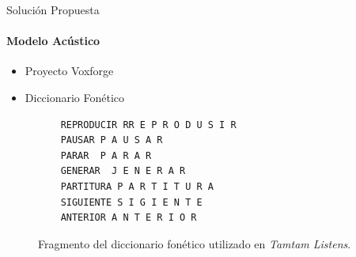 \begin{frame}[fragile]{Soluci\'on Propuesta}
\framesubtitle{Modelo Acústico}
\begin{itemize}
    \item Proyecto Voxforge
    \item Diccionario Fonético    
\end{itemize}

    \begin{figure}[H]
    \begin{lstlisting}
    REPRODUCIR RR E P R O D U S I R
    PAUSAR P A U S A R
    PARAR  P A R A R
    GENERAR  J E N E R A R
    PARTITURA P A R T I T U R A
    SIGUIENTE S I G I E N T E
    ANTERIOR A N T E R I O R
    \end{lstlisting}
    \caption{Fragmento del diccionario fon\'etico utilizado en \emph{Tamtam Listens}.}
    \label{figure:fragmento-dic}
\end{figure}

\end{frame}

